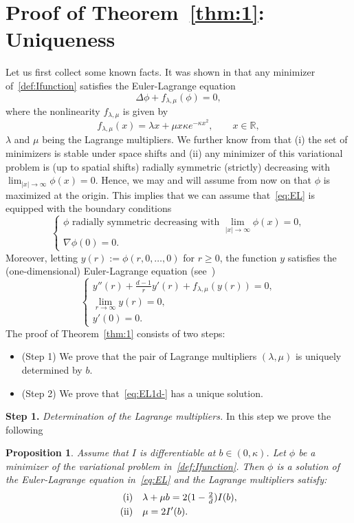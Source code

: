 \documentclass[a4paper,11pt]{amsart}
\numberwithin{equation}{section}
\newtheorem{proposition}[theorem]{Proposition}
\newcommand{\bbR}{{\ensuremath{\mathbb R}} }
\newcommand{\gD}{\Delta}
\newcommand{\gk}{\kappa}
\newcommand{\gl}{\lambda}
\newcommand{\8}{\infty}
\newcommand{\beq}{\begin{equation}}
\newcommand{\eeq}{\end{equation}}
\newcommand{\ba}{\begin{aligned}}
\newcommand{\ea}{\end{aligned}}
\begin{document}
\section{Proof of Theorem~\ref{thm:1}: Uniqueness}
\label{sec:uni}
%
Let us first collect some known facts.
It was shown in \cite{BBH2001} that any minimizer of~\eqref{def:Ifunction} satisfies the Euler-Lagrange equation 
\beq\label{eq:EL}
\gD \phi + f_{\gl,\mu}(\phi) = 0,
\eeq
where the nonlinearity $f_{\gl,\mu}$ is given by 
\begin{equation}
f_{\gl,\mu}(x)= \gl x + \mu x \gk e^{-\gk x^2}, \qquad x\in\bbR,
\end{equation}
$\gl$ and $\mu$ being the Lagrange multipliers. We further know from \cite{BBH2001} that (i) the set of minimizers is stable under space shifts and (ii) any minimizer of this variational problem is (up to spatial shifts) radially symmetric (strictly) decreasing with $\lim_{|x|\to\infty}\phi(x)= 0$. Hence, we may and will assume from now on that $\phi$ is maximized at the origin. This implies that we can assume that~\eqref{eq:EL} is equipped with the boundary conditions
\begin{equation}
\begin{cases}
\text{$\phi$ radially symmetric decreasing with }\lim_{|x|\to\infty}\phi(x)= 0,\\
\nabla \phi(0) = 0.
\end{cases}
\end{equation} 
Moreover, letting $y(r) := \phi(r, 0, \ldots, 0)$ for $r\ge 0$, the function $y$ satisfies the (one-dimensional) Euler-Lagrange equation (see~\cite[Proof of Lemma 11]{BBH2001})
\beq
\label{eq:EL1d-}
\begin{cases}
	y''(r) + \frac{d-1}{r} y'(r) +f_{\gl,\mu}(y(r))=0,\\
	\lim_{r\to\infty} y(r)=0,\\
	y'(0)=0.
\end{cases}
\eeq
The proof of Theorem~\ref{thm:1} consists of two steps:
\begin{itemize}
	\item (Step 1) We prove that the pair of Lagrange multipliers $(\gl,\mu)$ is uniquely determined by $b$.
	\item (Step 2) We prove that~\eqref{eq:EL1d-} has a unique solution. 
\end{itemize}
%
\textbf{Step 1.} \emph{Determination of the Lagrange multipliers.} In this step we prove the following
%
\begin{proposition}\label{pr:uniq-Lagr-mult}
Assume that $I$ is differentiable at $b\in(0,\gk)$. Let $\phi$ be a minimizer of the variational problem in~\eqref{def:Ifunction}. Then $\phi$ is a solution of the Euler-Lagrange equation in~\eqref{eq:EL} and the Lagrange multipliers satisfy:
	\beq
	\ba
	{\rm (i)}\quad & \gl + \mu b = 2(1-\tfrac 2 d) I(b),\\
	{\rm (ii)}\quad & \mu =2 I'(b).
	\ea
	\eeq
\end{proposition}
\end{document}
